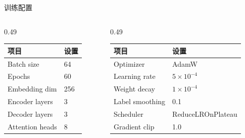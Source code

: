 \documentclass[aspectratio=169,10pt]{ctexbeamer}
\begin{document}
\begin{frame}{训练配置}
	\begin{columns}[T,onlytextwidth]
		\begin{column}{0.49\textwidth}
			\begin{table}
				\centering
				\small
				\begin{tabular}{l l}
					\toprule
					项目 & 设置 \\
					\midrule
					Batch size & 64 \\
					Epochs & 60 \\
					Embedding dim & 256 \\
					Encoder layers & 3 \\
					Decoder layers & 3 \\
					Attention heads & 8 \\
					\bottomrule
				\end{tabular}
			\end{table}
		\end{column}
		\begin{column}{0.49\textwidth}
			\begin{table}
				\centering
				\small
				\begin{tabular}{l l}
					\toprule
					项目 & 设置 \\
					\midrule
					Optimizer & AdamW \\
					Learning rate & $5\times10^{-4}$ \\
					Weight decay & $1\times10^{-4}$ \\
					Label smoothing & 0.1 \\
					Scheduler & ReduceLROnPlateau \\
					Gradient clip & 1.0 \\
					\bottomrule
				\end{tabular}
			\end{table}
		\end{column}
	\end{columns}
\end{frame}
\end{document}
